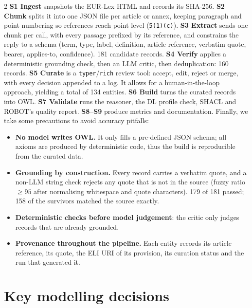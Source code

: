 \documentclass[10pt,a4paper]{article}
\begin{document}
\begin{multicols}{2}
\textbf{S1 Ingest} snapshots the EUR-Lex HTML and records its SHA-256.
\textbf{S2 Chunk} splits it into one JSON file per article or annex, keeping paragraph and point
numbering so references reach point level (\texttt{5(1)(c)}).
\textbf{S3 Extract} sends one chunk per call, with every passage prefixed by its reference, and
constrains the reply to a schema (term, type, label, definition, article reference,
verbatim quote, bearer, applies-to, confidence). 181 candidate records.
\textbf{S4 Verify} applies a deterministic grounding check, then an LLM critic, then deduplication:
160 records.
\textbf{S5 Curate} is a \texttt{typer}/\texttt{rich} review tool: accept, edit, reject or merge, with every decision appended to a log.
It allows for a human-in-the-loop approach, yielding a total of 134 entities.
\textbf{S6 Build} turns the curated records into OWL.
\textbf{S7 Validate} runs the reasoner, the DL profile check, SHACL and ROBOT's quality report.
\textbf{S8--S9} produce metrics and documentation.
Finally, we take some precautions to avoid accuracy pitfalls:

\begin{itemize}
  \item \textbf{No model writes OWL.} It only fills a pre-defined JSON schema; all axioms are
        produced by deterministic code, thus the build is reproducible from the curated data.
  \item \textbf{Grounding by construction.} Every record carries a verbatim quote, and a non-LLM
        string check rejects any quote that is not in the source (fuzzy ratio $\geq 95$ after
        normalising whitespace and quote characters). 179 of 181 passed; 158 of the survivors matched
        the source exactly.
  \item \textbf{Deterministic checks before model judgement}: the critic only judges records
        that are already grounded.
  \item \textbf{Provenance throughout the pipeline.} Each entity records its article reference, its quote, the ELI
        URI of its provision, its curation status and the run that generated it.
\end{itemize}

\section{Key modelling decisions}


\end{multicols}
\end{document}
